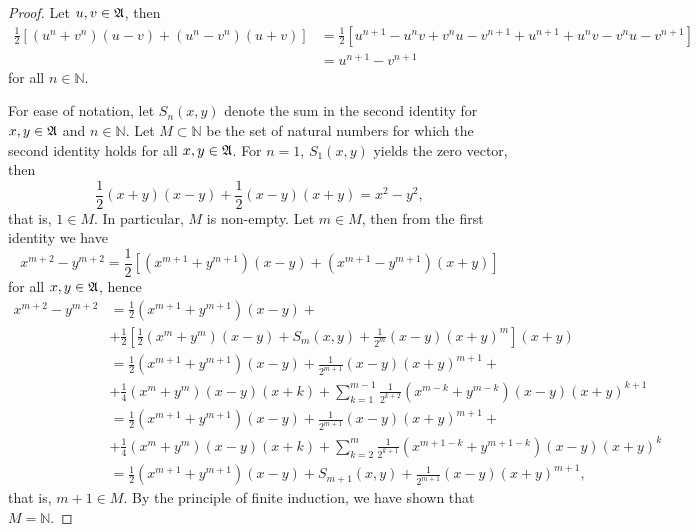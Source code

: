 \begin{proof}
    Let \(u,v \in \mathfrak{A}\), then
    \begin{align*}
        \frac12\left[(u^n + v^n)(u - v) + (u^n - v^n)(u+v)\right] &= \frac12 \left[u^{n+1} - u^n v + v^n u - v^{n+1} + u^{n+1} + u^nv - v^nu -v^{n+1}\right]\\&= u^{n+1} - v^{n+1}
    \end{align*}
    for all \(n \in \mathbb{N}\).

    For ease of notation, let \(S_n(x,y)\) denote the sum in the second identity for \(x,y \in \mathfrak{A}\) and \(n \in \mathbb{N}\).
    Let \(M \subset \mathbb{N}\) be the set of natural numbers for which the second identity holds for all \(x,y \in \mathfrak{A}\). For \(n = 1\), \(S_1(x,y)\) yields the zero vector, then
    \begin{equation*}
        \frac12 (x + y)(x - y) + \frac12(x-y)(x+y) = x^2 - y^2,
    \end{equation*}
    that is, \(1 \in M\). In particular, \(M\) is non-empty. Let \(m \in M\), then from the first identity we have
    \begin{equation*}
        x^{m+2} - y^{m+2} = \frac{1}{2}\left[(x^{m+1} + y^{m+1})(x - y) + (x^{m+1} - y^{m+1})(x+y)\right]
    \end{equation*}
    for all \(x,y \in \mathfrak{A}\), hence
    \begin{equation*}
        \begin{split}
            x^{m+2} - y^{m+2} &= \frac12 (x^{m+1} + y^{m+1})(x - y) + \\
                              &+\frac12\left[\frac12(x^{m} + y^{m})(x-y) + S_{m}(x,y) + \frac1{2^{m}}(x - y)(x+y)^{m} \right] (x+y)\\
                                &=\frac12 (x^{m+1} + y^{m+1})(x - y) + \frac{1}{2^{m+1}}(x-y)(x+y)^{m+1}+\\
                              &+\frac14 (x^{m} + y^{m})(x-y)(x+k) +  \sum_{k=1}^{m-1}\frac{1}{2^{k+2}}(x^{m-k} + y^{m-k})(x-y)(x+y)^{k+1}\\
                              &=\frac12 (x^{m+1} + y^{m+1})(x - y) + \frac{1}{2^{m+1}}(x-y)(x+y)^{m+1}+\\
                              &+\frac14 (x^{m} + y^{m})(x-y)(x+k) +  \sum_{k=2}^{m}\frac{1}{2^{k+1}}(x^{m+1-k} + y^{m+1-k})(x-y)(x+y)^{k}\\
                              &=\frac12 (x^{m+1} + y^{m+1})(x - y) + S_{m+1}(x,y) + \frac{1}{2^{m+1}}(x-y)(x+y)^{m+1},
        \end{split}
    \end{equation*}
    that is, \(m+1 \in M\). By the principle of finite induction, we have shown that \(M = \mathbb{N}\).
\end{proof}

